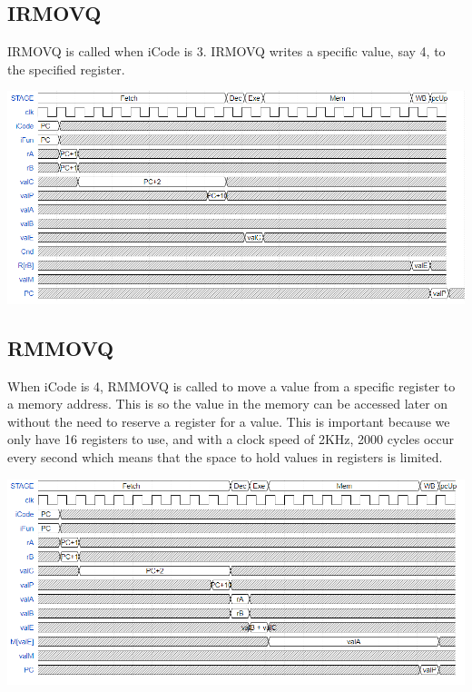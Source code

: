 \documentclass{article}
\begin{document}
\subsection{IRMOVQ}
IRMOVQ is called when iCode is 3. IRMOVQ writes a specific value, say 4, to the specified register. 
\begin{center}
    \includegraphics[scale=.6]{IRMOVQpic.png}
\end{center}
\subsection{RMMOVQ}
When iCode is 4, RMMOVQ is called to move a value from a specific register to a memory address. This is so the value in the memory can be accessed later on without the need to reserve a register for a value. This is important because we only have 16 registers to use, and with a clock speed of 2KHz, 2000 cycles occur every second which means that the space to hold values in registers is limited. 
\begin{center}
    \includegraphics[scale=.6]{RMMOVQpic.png}
\end{center}
\end{document}
